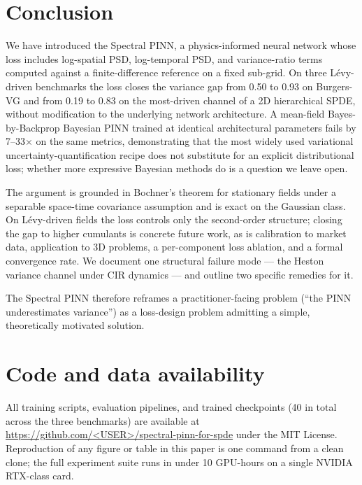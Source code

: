 \documentclass[review,12pt]{elsarticle}
\begin{document}
\section{Conclusion}
\label{sec:conclusion}

We have introduced the Spectral PINN, a physics-informed neural
network whose loss includes log-spatial PSD, log-temporal PSD,
and variance-ratio terms computed against a finite-difference
reference on a fixed sub-grid. On three L\'evy-driven benchmarks
the loss closes the variance gap from 0.50 to 0.93 on
Burgers-VG and from 0.19 to 0.83 on the most-driven channel of a
2D hierarchical SPDE, without modification to the underlying
network architecture. A mean-field Bayes-by-Backprop Bayesian
PINN trained at identical architectural parameters fails by
7--33\(\times\) on the same metrics, demonstrating that the most
widely used variational uncertainty-quantification recipe does
not substitute for an explicit distributional loss; whether more
expressive Bayesian methods do is a question we leave open.

The argument is grounded in Bochner's theorem for stationary
fields under a separable space-time covariance assumption and is
exact on the Gaussian class. On L\'evy-driven fields the loss
controls only the second-order structure; closing the gap to
higher cumulants is concrete future work, as is calibration to
market data, application to 3D problems, a per-component loss
ablation, and a formal convergence rate. We document one
structural failure mode --- the Heston variance channel under
CIR dynamics --- and outline two specific remedies for it.

The Spectral PINN therefore reframes a practitioner-facing
problem (``the PINN underestimates variance'') as a loss-design
problem admitting a simple, theoretically
motivated solution.

\section*{Code and data availability}

All training scripts, evaluation pipelines, and trained checkpoints
(40 in total across the three benchmarks) are available at
\url{https://github.com/<USER>/spectral-pinn-for-spde} under the
MIT License. Reproduction of any figure or table in this paper is
one command from a clean clone; the full experiment suite runs in
under 10 GPU-hours on a single NVIDIA RTX-class card.
\end{document}

